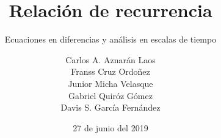 \documentclass[
	graybox,
	envcountchap,
	sectrefs
]{svmono}
\date{27 de junio del 2019}
\begin{document}
\hypersetup{pageanchor=false}

\author{
	Carlos A. Aznarán Laos\\
	Franss Cruz Ordoñez\\
	Junior Micha Velasque\\
	Gabriel Quiróz Gómez\\
	Davis S. García Fernández
}
\title{Relación de recurrencia}
\subtitle{Ecuaciones en diferencias y análisis en escalas de tiempo}
\maketitle

\frontmatter





\tableofcontents

%

\hypersetup{pageanchor=true}

\mainmatter

\begingroup
\let\clearpage\relax







%
\endgroup
%
\begingroup
\let\clearpage\relax
%
\endgroup
%
\begingroup
\let\clearpage\relax
%
%
%
\endgroup

\backmatter
%
%
%
\printindex
\end{document}
